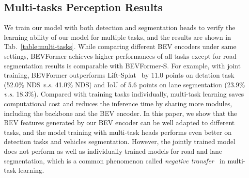 \documentclass{article}
\begin{document}
\subsection{Multi-tasks Perception Results}
We train our model with both detection and segmentation heads to verify the learning ability of our model for multiple tasks, and the results are shown in Tab.~\ref{table:multi-tasks}. 
While comparing different BEV encoders under same settings, BEVFormer achieves higher performances of all tasks except for road segmentation results is comparable with BEVFormer-S. For example, with joint training, BEVFormer outperforms Lift-Splat~\cite{philion2020lift} by 11.0 points on detation task (52.0\% NDS \emph{v.s.} 41.0\% NDS) and IoU of 5.6 points on lane segmentation (23.9\% \emph{v.s.} 18.3\%).
Compared with training tasks individually, multi-task learning  saves computational cost and reduces the inference time by sharing more modules, including the backbone and the BEV encoder. In this paper, we show that the BEV features generated by our BEV encoder can be well adapted to different tasks, and the model training with multi-task heads performs even better on detection tasks and vehicles segmentation. However, the jointly trained model does not perform as well as individually trained models for road and lane segmentation, which is a common phenomenon called \textit{negative transfer}~\cite{crawshaw2020multi,fifty2021efficiently} in multi-task learning.
\end{document}
